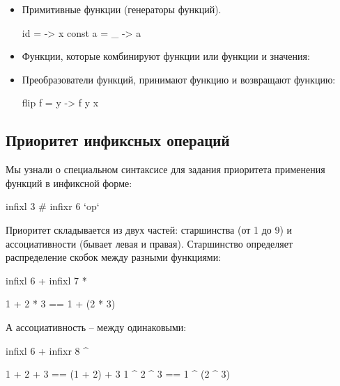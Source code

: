 \begin{itemize}

\item Примитивные функции (генераторы функций). 
        
\begin{code}
id      = \x -> x
const a = \_ -> a
\end{code}

\item Функции, которые комбинируют функции или функции и значения:
        
        
\item Преобразователи функций, принимают функцию и возвращают функцию:

\begin{code}
flip f = \x y -> f y x
\end{code}

\end{itemize}


\subsection*{Приоритет инфиксных операций}

Мы узнали о специальном синтаксисе для задания приоритета 
применения функций в инфиксной форме:

\begin{code}
infixl 3 #
infixr 6 `op`
\end{code}

Приоритет складывается из двух частей: старшинства (от 1 до 9)
и ассоциативности (бывает левая и правая). Старшинство определяет 
распределение скобок между разными функциями:

\begin{code}
infixl 6 +
infixl 7 *

1 + 2 * 3 == 1 + (2 * 3)
\end{code}

А ассоциативность -- между одинаковыми:

\begin{code}
infixl 6 +
infixr 8 ^

1 + 2 + 3 == (1 + 2) + 3    
1 ^ 2 ^ 3 ==  1 ^ (2 ^ 3)  
\end{code}

